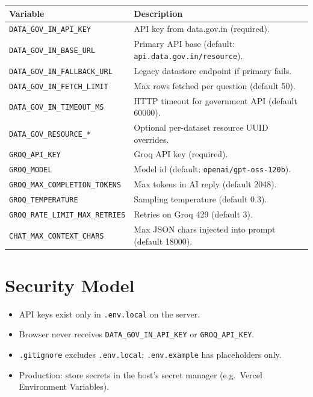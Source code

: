 \documentclass[11pt,a4paper]{article}
\begin{document}
\begin{longtable}{@{}p{4.5cm}p{9.5cm}@{}}
\toprule
\textbf{Variable} & \textbf{Description} \\
\midrule
\endhead
\texttt{DATA\_GOV\_IN\_API\_KEY} & API key from data.gov.in (required). \\
\texttt{DATA\_GOV\_IN\_BASE\_URL} & Primary API base (default: \texttt{api.data.gov.in/resource}). \\
\texttt{DATA\_GOV\_IN\_FALLBACK\_URL} & Legacy datastore endpoint if primary fails. \\
\texttt{DATA\_GOV\_IN\_FETCH\_LIMIT} & Max rows fetched per question (default 50). \\
\texttt{DATA\_GOV\_IN\_TIMEOUT\_MS} & HTTP timeout for government API (default 60000). \\
\texttt{DATA\_GOV\_RESOURCE\_*} & Optional per-dataset resource UUID overrides. \\
\texttt{GROQ\_API\_KEY} & Groq API key (required). \\
\texttt{GROQ\_MODEL} & Model id (default: \texttt{openai/gpt-oss-120b}). \\
\texttt{GROQ\_MAX\_COMPLETION\_TOKENS} & Max tokens in AI reply (default 2048). \\
\texttt{GROQ\_TEMPERATURE} & Sampling temperature (default 0.3). \\
\texttt{GROQ\_RATE\_LIMIT\_MAX\_RETRIES} & Retries on Groq 429 (default 3). \\
\texttt{CHAT\_MAX\_CONTEXT\_CHARS} & Max JSON chars injected into prompt (default 18000). \\
\bottomrule
\end{longtable}

\section{Security Model}

\begin{itemize}
  \item API keys exist only in \texttt{.env.local} on the server.
  \item Browser never receives \texttt{DATA\_GOV\_IN\_API\_KEY} or \texttt{GROQ\_API\_KEY}.
  \item \texttt{.gitignore} excludes \texttt{.env.local}; \texttt{.env.example} has placeholders only.
  \item Production: store secrets in the host's secret manager (e.g.\ Vercel Environment Variables).
\end{itemize}
\end{document}
